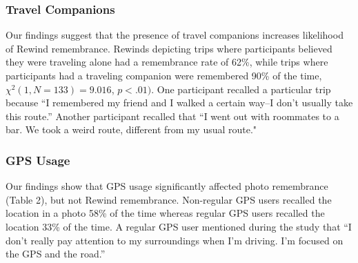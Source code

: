 \documentclass{sigchi}
\begin{document}
\subsubsection{Travel Companions}
Our findings suggest that the presence of travel companions increases likelihood of Rewind remembrance. Rewinds depicting trips where participants believed they were traveling alone had a remembrance rate of 62\%, while trips where participants had a traveling companion were remembered 90\% of the time, $\chi^2(1, N=133) = 9.016$, $p < .01)$. One participant recalled a particular trip because ``I remembered my friend and I walked a certain way--I don't usually take this route.'' Another participant recalled that ``I went out with roommates to a bar. We took a weird route, different from my usual route."


\subsubsection{GPS Usage}
Our findings show that GPS usage significantly affected photo remembrance (Table 2), but not Rewind remembrance. Non-regular GPS users recalled the location in a photo 58\% of the time whereas regular GPS users recalled the location 33\% of the time. A regular GPS user mentioned during the study that ``I don't really pay attention to my surroundings when I'm driving. I'm focused on the GPS and the road.'' 
\end{document}
